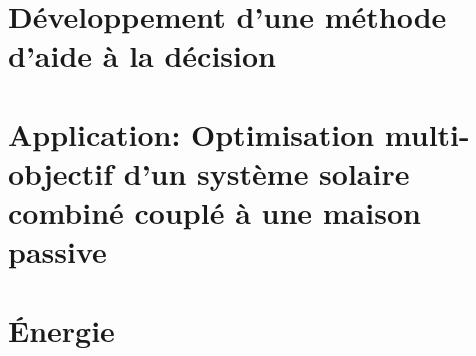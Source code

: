 \documentclass[11pt, oneside, fixOverflow]{JeremyThesis}
\begin{document}
\chapter{Développement d’une méthode d’aide à la décision}
% 

\chapter{Application: Optimisation multi-objectif d’un système solaire combiné couplé à une maison passive}
% 

% 


\newpage
\addappheadtotoc
\appendix
\appendixpage

\chapter*{Énergie} %
\label{cha:energie}


% 
% 

% 

% 

% 

% 

\newpage
\printbibliography[title={Références bibliographiques}]
\end{document}
